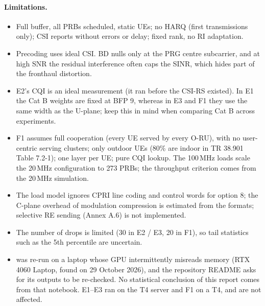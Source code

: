 \documentclass[11pt,a4paper]{article}
\DeclareRobustCommand{\code}[1]{\codeurl{#1}}  %
\begin{document}
\paragraph{Limitations.}
\begin{itemize}
  \item Full buffer, all PRBs scheduled, static UEs; no HARQ (first transmissions only); CSI reports without errors or delay;
        fixed rank, no RI adaptation.
  \item Precoding uses ideal CSI. BD nulls only at the PRG centre subcarrier, and at high SNR the residual interference often
        caps the SINR, which hides part of the fronthaul distortion.
  \item E2's CQI is an ideal measurement (it ran before the CSI-RS existed). In E1 the Cat B weights are fixed at BFP 9, whereas in
        E3 and F1 they use the same width as the U-plane; keep this in mind when comparing Cat B across experiments.
  \item F1 assumes full cooperation (every UE served by every O-RU), with no user-centric serving clusters; only outdoor UEs (80\%
        are indoor in TR 38.901 Table 7.2-1); one layer per UE; pure CQI lookup. The 100\,MHz loads scale the 20\,MHz configuration
        to 273 PRBs; the throughput criterion comes from the 20\,MHz simulation.
  \item The load model ignores CPRI line coding and control words for option 8; the C-plane overhead of modulation compression is
        estimated from the formats; selective RE sending (Annex A.6) is not implemented.
  \item The number of drops is limited (30 in E2 / E3, 20 in F1), so tail statistics such as the 5th percentile are uncertain.
  \item \code{closed_loop_walkthrough.ipynb} was re-run on a laptop whose GPU intermittently misreads memory (RTX 4060 Laptop, found
        on 29 October 2026), and the repository README asks for its outputs to be re-checked. No statistical conclusion of this
        report comes from that notebook. E1--E3 ran on the T4 server and F1 on a T4, and are not affected.
\end{itemize}
\end{document}
